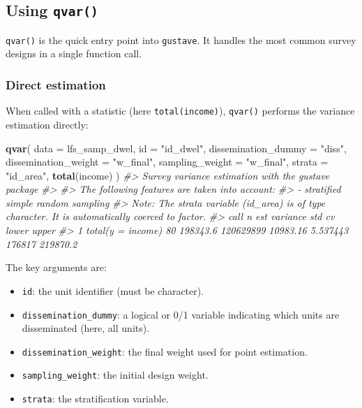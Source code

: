 \documentclass[
]{article}
\newenvironment{Shaded}{\begin{snugshade}}{\end{snugshade}}
\newcommand{\AttributeTok}[1]{\textcolor[rgb]{0.13,0.29,0.53}{#1}}
\newcommand{\CommentTok}[1]{\textcolor[rgb]{0.56,0.35,0.01}{\textit{#1}}}
\newcommand{\FunctionTok}[1]{\textcolor[rgb]{0.13,0.29,0.53}{\textbf{#1}}}
\newcommand{\NormalTok}[1]{#1}
\newcommand{\StringTok}[1]{\textcolor[rgb]{0.31,0.60,0.02}{#1}}
\providecommand{\tightlist}{%
  \setlength{\itemsep}{0pt}\setlength{\parskip}{0pt}}
\begin{document}
\subsection{\texorpdfstring{Using
\texttt{qvar()}}{Using qvar()}}\label{using-qvar}

\texttt{qvar()} is the quick entry point into \texttt{gustave}. It
handles the most common survey designs in a single function call.

\subsubsection{Direct estimation}\label{direct-estimation}

When called with a statistic (here \texttt{total(income)}),
\texttt{qvar()} performs the variance estimation directly:

\begin{Shaded}
\begin{Highlighting}[]
\FunctionTok{qvar}\NormalTok{(}
  \AttributeTok{data =}\NormalTok{ lfs\_samp\_dwel,}
  \AttributeTok{id =} \StringTok{"id\_dwel"}\NormalTok{,}
  \AttributeTok{dissemination\_dummy  =} \StringTok{"diss"}\NormalTok{,}
  \AttributeTok{dissemination\_weight =} \StringTok{"w\_final"}\NormalTok{,}
  \AttributeTok{sampling\_weight =} \StringTok{"w\_final"}\NormalTok{,}
  \AttributeTok{strata =} \StringTok{"id\_area"}\NormalTok{,}
  \FunctionTok{total}\NormalTok{(income)}
\NormalTok{)}
\CommentTok{\#\textgreater{} Survey variance estimation with the gustave package}
\CommentTok{\#\textgreater{} }
\CommentTok{\#\textgreater{} The following features are taken into account:}
\CommentTok{\#\textgreater{}   {-} stratified simple random sampling}
\CommentTok{\#\textgreater{} Note: The strata variable (id\_area) is of type character. It is automatically coerced to factor.}
\CommentTok{\#\textgreater{}                call  n      est  variance      std       cv  lower    upper}
\CommentTok{\#\textgreater{} 1 total(y = income) 80 198343.6 120629899 10983.16 5.537443 176817 219870.2}
\end{Highlighting}
\end{Shaded}

The key arguments are:

\begin{itemize}
\tightlist
\item
  \texttt{id}: the unit identifier (must be character).
\item
  \texttt{dissemination\_dummy}: a logical or 0/1 variable indicating
  which units are disseminated (here, all units).
\item
  \texttt{dissemination\_weight}: the final weight used for point
  estimation.
\item
  \texttt{sampling\_weight}: the initial design weight.
\item
  \texttt{strata}: the stratification variable.
\end{itemize}
\end{document}
